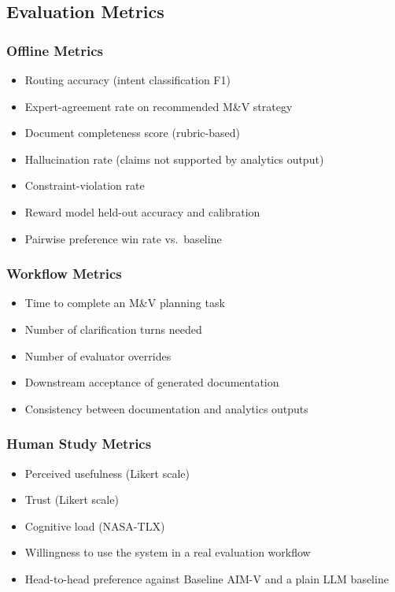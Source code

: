 \documentclass[11pt,a4paper]{article}
\begin{document}
\subsection{Evaluation Metrics}

\subsubsection{Offline Metrics}
\begin{itemize}
    \item Routing accuracy (intent classification F1)
    \item Expert-agreement rate on recommended M\&V strategy
    \item Document completeness score (rubric-based)
    \item Hallucination rate (claims not supported by analytics output)
    \item Constraint-violation rate
    \item Reward model held-out accuracy and calibration
    \item Pairwise preference win rate vs.\ baseline
\end{itemize}

\subsubsection{Workflow Metrics}
\begin{itemize}
    \item Time to complete an M\&V planning task
    \item Number of clarification turns needed
    \item Number of evaluator overrides
    \item Downstream acceptance of generated documentation
    \item Consistency between documentation and analytics outputs
\end{itemize}

\subsubsection{Human Study Metrics}
\begin{itemize}
    \item Perceived usefulness (Likert scale)
    \item Trust (Likert scale)
    \item Cognitive load (NASA-TLX)
    \item Willingness to use the system in a real evaluation workflow
    \item Head-to-head preference against Baseline AIM-V and a plain LLM baseline
\end{itemize}
\end{document}
